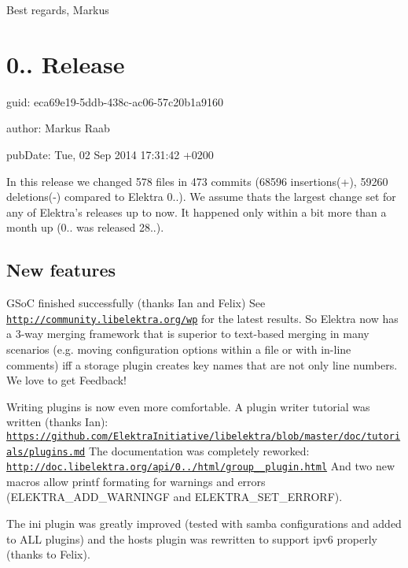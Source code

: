 Best regards, Markus

\section*{0.. Release}


\begin{DoxyItemize}
\item guid\+: eca69e19-\/5ddb-\/438c-\/ac06-\/57c20b1a9160
\item author\+: Markus Raab
\item pub\+Date\+: Tue, 02 Sep 2014 17\+:31\+:42 +0200
\end{DoxyItemize}

In this release we changed 578 files in 473 commits (68596 insertions(+), 59260 deletions(-\/) compared to Elektra 0..). We assume thats the largest change set for any of Elektra's releases up to now. It happened only within a bit more than a month up (0.. was released 28..).

\subsection*{New features}

G\+So\+C finished successfully (thanks Ian and Felix) See \href{http://community.libelektra.org/wp}{\tt http\+://community.\+libelektra.\+org/wp} for the latest results. So Elektra now has a 3-\/way merging framework that is superior to text-\/based merging in many scenarios (e.\+g. moving configuration options within a file or with in-\/line comments) iff a storage plugin creates key names that are not only line numbers. We love to get Feedback!

Writing plugins is now even more comfortable. A plugin writer tutorial was written (thanks Ian)\+: \href{https://github.com/ElektraInitiative/libelektra/blob/master/doc/tutorials/plugins.md}{\tt https\+://github.\+com/\+Elektra\+Initiative/libelektra/blob/master/doc/tutorials/plugins.\+md} The documentation was completely reworked\+: \href{http://doc.libelektra.org/api/0.8.7/html/group__plugin.html}{\tt http\+://doc.\+libelektra.\+org/api/0../html/group\+\_\+\+\_\+plugin.\+html} And two new macros allow printf formating for warnings and errors (E\+L\+E\+K\+T\+R\+A\+\_\+\+A\+D\+D\+\_\+\+W\+A\+R\+N\+I\+N\+G\+F and E\+L\+E\+K\+T\+R\+A\+\_\+\+S\+E\+T\+\_\+\+E\+R\+R\+O\+R\+F).

The ini plugin was greatly improved (tested with samba configurations and added to A\+L\+L plugins) and the hosts plugin was rewritten to support ipv6 properly (thanks to Felix).

